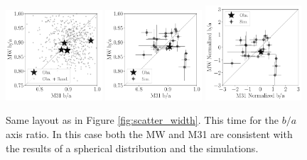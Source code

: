 \documentclass[a4paper,fleqn,usenatbib]{mnras}
\begin{document}
\begin{figure}
\centering
\includegraphics[width=0.32\textwidth]{scatter_random_ranked_ba_ratio.pdf}
\includegraphics[width=0.32\textwidth]{scatter_ranked_ba_ratio.pdf}
\includegraphics[width=0.32\textwidth]{scatter_norm_ranked_ba_ratio.pdf}
\caption{Same layout as in Figure \ref{fig:scatter_width}. 
This time for the $b/a$ axis ratio. In this case both the MW and M31
are consistent with the results of a spherical distribution and the
simulations. 
\label{fig:scatter_ba_ratio}}
\end{figure}
\end{document}
